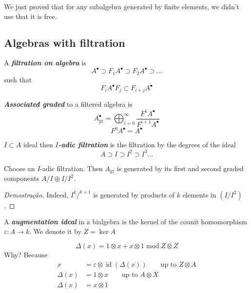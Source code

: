 \begin{remark}
	We just proved that for any subalgebra generated by finite elements, we didn't use that it is free.
\end{remark}

\subsection{Algebras with filtration}

\begin{defn}
	A \textit{\textbf{filtration on algebra}} is
	\[A^\bullet  \supset  F_1A^\bullet\supset F_2A^\bullet\supset\ldots\]
	such that
	 \[F_i A^\bullet F_j\subset F_{i+j}A^\bullet\]
\end{defn}

\begin{defn}
	\textit{\textbf{Associated graded}} to a filtered algebra is
\[A^\bullet_{\operatorname{gr}}=\bigoplus_{i=0}^\infty \dfrac{F^1A^\bullet}{F^{i+1}A^\bullet} \]
\[F^0A^\bullet=A^\bullet\]
\end{defn}

\begin{defn}
	$I\subset A$ ideal then \textit{\textbf{$I$-adic filtration}} is the filtration by the degrees of the ideal
	\[A\supset I\supset  I^2 \supset  I^3\ldots\]
\end{defn}

\begin{lemma}
	Choose an $I$-adic filtration. Then $A_{\operatorname{gr}}$ is generated by its first and second graded components $A/I\oplus I/I^2$.
\end{lemma}

\begin{proof}[Demostra\c c\~ao]
	Indeed, $I^k/^{k+1}$ is generated by products of $k$ elements in $(I/I^2)$.
\end{proof}

\begin{defn}
	A \textit{\textbf{augmentation ideal}} in a bialgebra is the kernel of the counit homomorphism $\varepsilon:A\to k$. We denote it by $Z=\ker A$
\end{defn}

\begin{remark}
\[\Delta(x)=1\otimes x+x\otimes 1 \operatorname{mod}Z\otimes Z\]
Why? Because
\begin{align*}
	x&=\varepsilon \otimes \operatorname{id}(\Delta(x))\qquad \text{up to $Z\otimes A$}\\
	\Delta(x)& =1\otimes x\qquad \text{up to $A\otimes X$} \\
	\Delta(x)&=x\otimes 1
\end{align*}
\end{remark}

